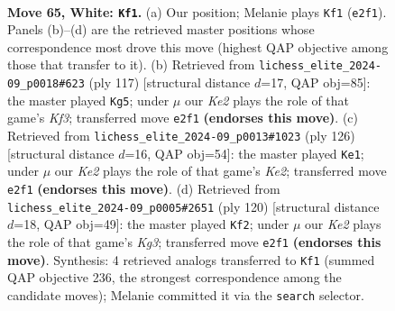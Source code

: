 \documentclass[11pt]{article}
\begin{document}
\clearpage

\begin{figure}[p]\centering
\begin{subfigure}{0.46\textwidth}\centering
\resizebox{\linewidth}{!}{%
\newchessgame
\chessboard[
  setfen={1R6/R4pk1/4p3/8/P3P3/5P2/r3K3/8 w - - 21 65},
  showmover=false,
  pgfstyle=straightmove, color=movearrow, markmove={e2-f1}
]}
\caption{}
\end{subfigure}\hfill
\begin{subfigure}{0.46\textwidth}\centering
\resizebox{\linewidth}{!}{%
\newchessgame
\chessboard[
  setfen={8/8/R4k2/4p3/p5P1/6K1/r4P2/8 b - - 1 59},
  showmover=false,
  pgfstyle=straightmove, color=movearrow, markmove={f6-g5}
]}
\caption{}
\end{subfigure}
\\[4pt]
\begin{subfigure}{0.46\textwidth}\centering
\resizebox{\linewidth}{!}{%
\newchessgame
\chessboard[
  setfen={8/8/4k3/2R2p2/5p2/2P2P2/2r1K3/8 w - - 11 64},
  showmover=false,
  pgfstyle=straightmove, color=movearrow, markmove={e2-e1}
]}
\caption{}
\end{subfigure}\hfill
\begin{subfigure}{0.46\textwidth}\centering
\resizebox{\linewidth}{!}{%
\newchessgame
\chessboard[
  setfen={8/8/R5pk/1p6/6P1/5PK1/8/6r1 w - - 7 61},
  showmover=false,
  pgfstyle=straightmove, color=movearrow, markmove={g3-f2}
]}
\caption{}
\end{subfigure}
\caption{\textbf{Move 65, White: \texttt{Kf1}.} (a) Our position; Melanie plays \texttt{Kf1} (\texttt{e2f1}). Panels (b)--(d) are the retrieved master positions whose correspondence most drove this move (highest QAP objective among those that transfer to it). (b) Retrieved from \texttt{lichess\_elite\_2024-09\_p0018\#623} (ply 117) [structural distance $d$=17, QAP obj=85]: the master played \texttt{Kg5}; under $\mu$ our \emph{Ke2} plays the role of that game's \emph{Kf3}; transferred move \texttt{e2f1} \textbf{(endorses this move)}. (c) Retrieved from \texttt{lichess\_elite\_2024-09\_p0013\#1023} (ply 126) [structural distance $d$=16, QAP obj=54]: the master played \texttt{Ke1}; under $\mu$ our \emph{Ke2} plays the role of that game's \emph{Ke2}; transferred move \texttt{e2f1} \textbf{(endorses this move)}. (d) Retrieved from \texttt{lichess\_elite\_2024-09\_p0005\#2651} (ply 120) [structural distance $d$=18, QAP obj=49]: the master played \texttt{Kf2}; under $\mu$ our \emph{Ke2} plays the role of that game's \emph{Kg3}; transferred move \texttt{e2f1} \textbf{(endorses this move)}. Synthesis: 4 retrieved analogs transferred to \texttt{Kf1} (summed QAP objective 236, the strongest correspondence among the candidate moves); Melanie committed it via the \texttt{search} selector.}
\label{fig:thought-m128}
\end{figure}
\end{document}
